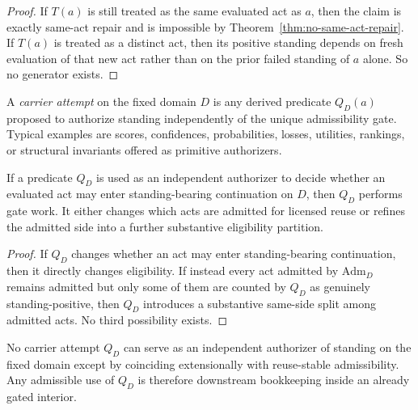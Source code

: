 \begin{proof}
If $T(a)$ is still treated as the same evaluated act as $a$, then the claim is exactly same-act repair and is impossible by Theorem~\ref{thm:no-same-act-repair}. If $T(a)$ is treated as a distinct act, then its positive standing depends on fresh evaluation of that new act rather than on the prior failed standing of $a$ alone. So no generator exists.\cite{MaleyNecessity,MaleyUnus}
\end{proof}

\begin{definition}
A \emph{carrier attempt} on the fixed domain $D$ is any derived predicate $Q_D(a)$ proposed to authorize standing independently of the unique admissibility gate. Typical examples are scores, confidences, probabilities, losses, utilities, rankings, or structural invariants offered as primitive authorizers.
\end{definition}

\begin{lemma}
\label{lem:independent-authorizer-induces-gate-work}
If a predicate $Q_D$ is used as an independent authorizer to decide whether an evaluated act may enter standing-bearing continuation on $D$, then $Q_D$ performs gate work. It either changes which acts are admitted for licensed reuse or refines the admitted side into a further substantive eligibility partition.
\end{lemma}

\begin{proof}
If $Q_D$ changes whether an act may enter standing-bearing continuation, then it directly changes eligibility. If instead every act admitted by $\mathrm{Adm}_D$ remains admitted but only some of them are counted by $Q_D$ as genuinely standing-positive, then $Q_D$ introduces a substantive same-side split among admitted acts. No third possibility exists.\cite{MaleyNecessity}
\end{proof}

\begin{theorem}
\label{thm:no-independent-carriers}
No carrier attempt $Q_D$ can serve as an independent authorizer of standing on the fixed domain except by coinciding extensionally with reuse-stable admissibility. Any admissible use of $Q_D$ is therefore downstream bookkeeping inside an already gated interior.
\end{theorem}

